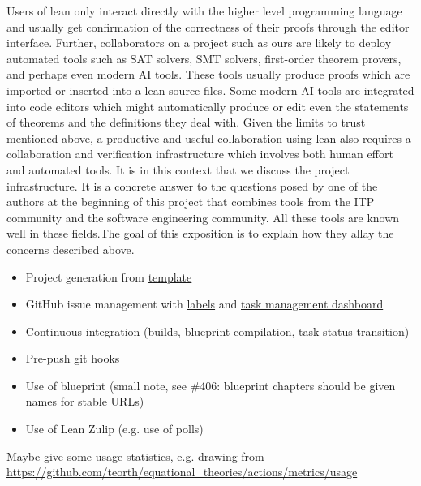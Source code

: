 Users of lean only interact directly with the higher level programming language and usually get confirmation of the correctness of their proofs through the editor interface. Further, collaborators on a project such as ours are likely to deploy automated tools such as SAT solvers, SMT solvers, first-order theorem provers, and perhaps even modern AI tools. These tools usually produce proofs which are imported or inserted into a lean source files. Some modern AI tools are integrated into code editors which might automatically produce or edit even the statements of theorems and the definitions they deal with. Given the limits to trust mentioned above, a productive and useful collaboration using lean also requires a collaboration and verification infrastructure which involves both human effort and automated tools. It is in this context that we discuss the project infrastructure. It is a concrete answer to the questions posed by one of the authors at the beginning of this project \cite{Tao_blog_Sep_2024} that combines tools from the ITP community and the software engineering community. All these tools are known well in these fields.The goal of this exposition is to explain how they allay the concerns described above.

\begin{itemize}
    \item Project generation from \href{https://github.com/pitmonticone/LeanProject}{template}
    \item GitHub issue management with \href{https://github.com/teorth/equational_theories/labels}{labels} and \href{https://github.com/users/teorth/projects/1}{task management dashboard}
    \item Continuous integration (builds, blueprint compilation, task status transition)
    \item Pre-push git hooks
    \item Use of blueprint (small note, see \#406: blueprint chapters should be given names for stable URLs)
    \item Use of Lean Zulip (e.g. use of polls)
\end{itemize}

Maybe give some usage statistics, e.g. drawing from \url{https://github.com/teorth/equational_theories/actions/metrics/usage}

